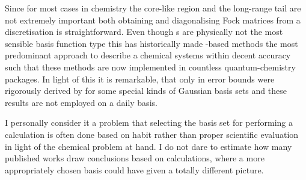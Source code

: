 Since for most cases in chemistry the core-like region
and the long-range tail are not extremely important
both obtaining and diagonalising Fock matrices
from a \cGTO discretisation is straightforward.
Even though {\cGTO}s are physically not the most sensible basis function type
this has historically made \cGTO-based methods
the most predominant approach to describe
a chemical systems within decent accuracy
such that these methods are now implemented in countless quantum-chemistry packages.
In light of this it is remarkable,
that only in \citeyear{Bachmayr2014}
error bounds were rigorously derived by \citet{Bachmayr2014} for some special
kinds of Gaussian basis sets
and these results are not employed on a daily basis.

I personally consider it a problem
that selecting the \cGTO basis set for performing a calculation is often done
based on habit rather than proper scientific evaluation
in light of the chemical problem at hand.
I do not dare to estimate how many published works
draw conclusions based on calculations,
where a more appropriately chosen basis
could have given a totally different picture.

